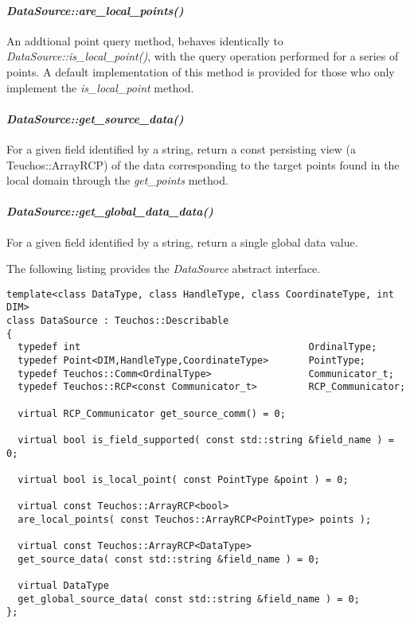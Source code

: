 \documentclass[letterpaper]{article}
\begin{document}
\paragraph{\sl DataSource::are\_local\_points()}
An addtional point query method, behaves identically to {\sl
  DataSource::is\_local\_point()}, with the query operation performed
for a series of points. A default implementation of this method is
provided for those who only implement the {\sl is\_local\_point}
method.

\paragraph{\sl DataSource::get\_source\_data()}
For a given field identified by a string, return a const persisting
view (a Teuchos::ArrayRCP) of the data corresponding to the target
points found in the local domain through the {\sl get\_points} method.

\paragraph{\sl DataSource::get\_global\_data\_data()}
For a given field identified by a string, return a single global data
value.

The following listing provides the {\sl DataSource} abstract
interface. 

\begin{lstlisting}
template<class DataType, class HandleType, class CoordinateType, int DIM>
class DataSource : Teuchos::Describable
{
  typedef int                                        OrdinalType;
  typedef Point<DIM,HandleType,CoordinateType>       PointType;
  typedef Teuchos::Comm<OrdinalType>                 Communicator_t;
  typedef Teuchos::RCP<const Communicator_t>         RCP_Communicator;

  virtual RCP_Communicator get_source_comm() = 0;

  virtual bool is_field_supported( const std::string &field_name ) = 0;

  virtual bool is_local_point( const PointType &point ) = 0;

  virtual const Teuchos::ArrayRCP<bool> 
  are_local_points( const Teuchos::ArrayRCP<PointType> points );

  virtual const Teuchos::ArrayRCP<DataType> 
  get_source_data( const std::string &field_name ) = 0;

  virtual DataType 
  get_global_source_data( const std::string &field_name ) = 0;
};
\end{lstlisting}
\end{document}
